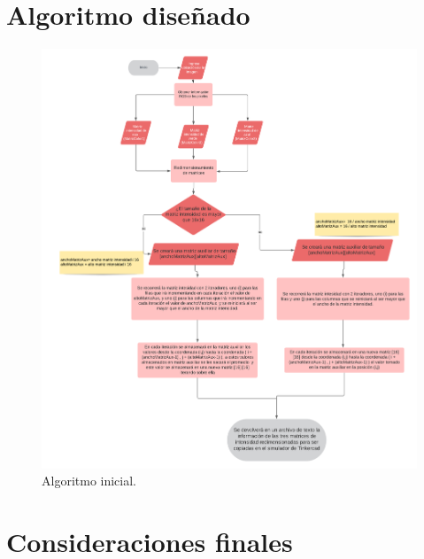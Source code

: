 \documentclass{article}
\begin{document}
\section{Algoritmo diseñado} \label{algorimo}
\begin{figure}[h]
\includegraphics[width=15cm]{algoritmo.png}
\centering
\caption{Algoritmo inicial.}
\label{fig:algoritmo}
\end{figure}

\newpage
\section{Consideraciones finales} \label{consideracionesfinales}
\end{document}

